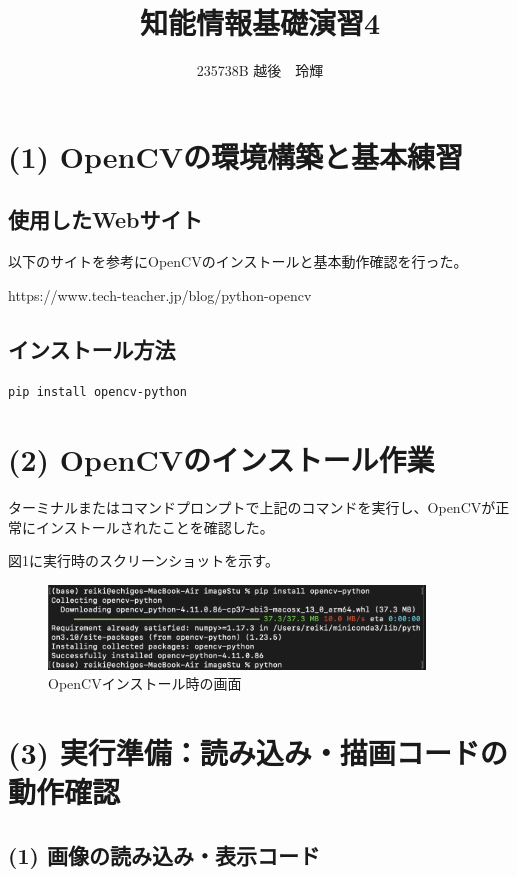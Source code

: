 \documentclass[a4paper,11pt,titlepage]{jsarticle}
\title{知能情報基礎演習4}
\author{235738B 越後　玲輝}
\begin{document}
\maketitle

\section*{(1) OpenCVの環境構築と基本練習}

\subsection*{使用したWebサイト}
以下のサイトを参考にOpenCVのインストールと基本動作確認を行った。

https://www.tech-teacher.jp/blog/python-opencv

\subsection*{インストール方法}

\begin{lstlisting}[caption=OpenCVのインストールコマンド]
pip install opencv-python
\end{lstlisting}

\section*{(2) OpenCVのインストール作業}

ターミナルまたはコマンドプロンプトで上記のコマンドを実行し、OpenCVが正常にインストールされたことを確認した。

図1に実行時のスクリーンショットを示す。

\begin{figure}[H]
    \centering
    \includegraphics[width=10cm]{install_screenshot.png}
    \caption{OpenCVインストール時の画面}
\end{figure}

\section*{(3) 実行準備：読み込み・描画コードの動作確認}

\subsection*{(1) 画像の読み込み・表示コード}
\end{document}
